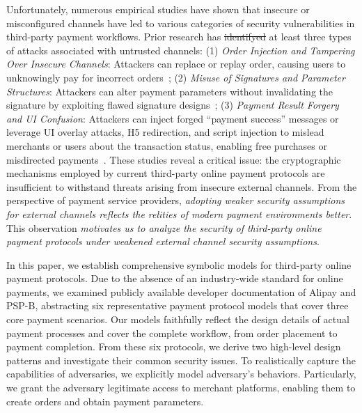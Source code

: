 \documentclass[journal]{IEEEtran}
\makeatletter
\providecommand{\DIFaddtex}[1]{{\protect\color{blue}\uwave{#1}}} %
\providecommand{\DIFdeltex}[1]{{\protect\color{red}\sout{#1}}} %
\providecommand{\DIFaddbegin}{} %
\providecommand{\DIFaddend}{} %
\providecommand{\DIFdelbegin}{} %
\providecommand{\DIFdelend}{} %
\providecommand{\DIFadd}[1]{\texorpdfstring{\DIFaddtex{#1}}{#1}} %
\providecommand{\DIFdel}[1]{\texorpdfstring{\DIFdeltex{#1}}{}} %
\providecommand{\DIFscaledelfig}{0.5}
\newlength{\DIFdelgraphicswidth} %
\newlength{\DIFdelgraphicsheight} %
\providecommand{\DIFaddincludegraphics}[2][]{{\color{blue}\fbox{\DIFOincludegraphics[#1]{#2}}}} %
\providecommand{\DIFdelincludegraphics}[2][]{%
\sbox{\DIFdelgraphicsbox}{\DIFOincludegraphics[#1]{#2}}%
\settoboxwidth{\DIFdelgraphicswidth}{\DIFdelgraphicsbox} %
\settoboxtotalheight{\DIFdelgraphicsheight}{\DIFdelgraphicsbox} %
\scalebox{\DIFscaledelfig}{%
\parbox[b]{\DIFdelgraphicswidth}{\usebox{\DIFdelgraphicsbox}\\[-\baselineskip] \rule{\DIFdelgraphicswidth}{0em}}\llap{\resizebox{\DIFdelgraphicswidth}{\DIFdelgraphicsheight}{%
\setlength{\unitlength}{\DIFdelgraphicswidth}%
\begin{picture}(1,1)%
\thicklines\linethickness{2pt} %
{\color[rgb]{1,0,0}\put(0,0){\framebox(1,1){}}}%
{\color[rgb]{1,0,0}\put(0,0){\line( 1,1){1}}}%
{\color[rgb]{1,0,0}\put(0,1){\line(1,-1){1}}}%
\end{picture}%
}\hspace*{3pt}}} %
} %
\DeclareRobustCommand{\DIFaddbegin}{\DIFOaddbegin \let\includegraphics\DIFaddincludegraphics} %
\DeclareRobustCommand{\DIFaddend}{\DIFOaddend \let\includegraphics\DIFOincludegraphics} %
\DeclareRobustCommand{\DIFdelbegin}{\DIFOdelbegin \let\includegraphics\DIFdelincludegraphics} %
\DeclareRobustCommand{\DIFdelend}{\DIFOaddend \let\includegraphics\DIFOincludegraphics} %
\let\sout@orig\sout %
\renewcommand{\sout}[1]{\ifmmode\text{\sout@orig{\ensuremath{#1}}}\else\sout@orig{#1}\fi} %
\makeatother
\begin{document}
Unfortunately, numerous empirical studies have shown that insecure or misconfigured channels have led to various categories of security vulnerabilities in third-party payment workflows.
Prior research has \DIFdelbegin \DIFdel{identifyed }\DIFdelend \DIFaddbegin \DIFadd{identified }\DIFaddend at least three types of attacks associated with untrusted channels:
(1) \emph{Order Injection and Tampering Over Insecure Channels}: 
Attackers can replace or replay order\DIFaddbegin \DIFadd{s}\DIFaddend  , causing users to unknowingly pay for incorrect orders~\cite{Sun2014DetectingECommerce, Yang2017FlawedImplementations};
(2) \emph{Misuse of Signatures and Parameter Structures}: 
Attackers can alter payment parameters without invalidating the signature by exploiting flawed signature designs~\cite{Lou2021PaymentVulnerabilities};
(3) \emph{Payment Result Forgery and UI Confusion}: 
Attackers can inject forged ``payment success'' messages or leverage UI overlay attacks, H5 redirection, and script injection to mislead merchants or users about the transaction status, enabling free purchases or misdirected payments~\cite{Ulqinaku2019ScanAndPayAndroid, Yang2017FlawedImplementations}.
These studies reveal a critical issue: the cryptographic mechanisms employed by current third-party online payment protocols are insufficient to withstand threats arising from insecure external channels.
From the perspective of payment service providers, \emph{adopting weaker security assumptions for external channels reflects the re\DIFaddbegin \DIFadd{a}\DIFaddend lities of modern payment environments better}.
This observation \emph{motivates us to analyze the security of third-party online payment protocols under weakened external channel security assumptions}.

In this paper, we establish comprehensive symbolic models for third-party online payment protocols.
Due to the absence of an industry-wide standard for online payments, we examined publicly available developer documentation of Alipay\cite{Alipay2025OpenPlatform} and PSP-B,
abstracting six representative payment protocol models that cover three core payment scenarios.
Our models faithfully reflect the design details of actual payment processes and cover the complete workflow, from order placement to payment completion.
From these six protocols, we derive two high-level design patterns and investigate their common security issues.
To realistically capture the capabilities of adversaries, we explicitly model adversary's behaviors.
Particularly, we grant the adversary legitimate access to merchant platforms, enabling them to create orders and obtain payment parameters.
\end{document}
